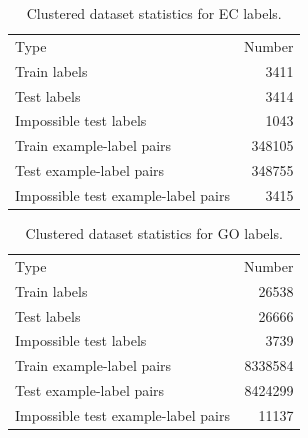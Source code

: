   \DIFaddend \begin{table}[htbp]
    \centering
    \begin{tabular}{|l|r|}
    \hline
                                    Type &  Number \\
    \Xhline{2pt}
                            Train labels &    3411 \\
    \hline
                             Test labels &    3414 \\
    \hline
                  Impossible test labels &    1043 \\
    \hline
               Train example-label pairs &  348105 \\
    \hline
                Test example-label pairs &  348755 \\
    \hline
     Impossible test example-label pairs &    3415 \\
    \hline
    \end{tabular}
    \caption{Clustered dataset statistics for EC labels.}
    \end{table}
  \begin{table}[htbp]
  \centering
  \begin{tabular}{|l|r|}
  \hline
                                  Type &   Number \\
  \Xhline{2pt}
                          Train labels &    26538 \\
  \hline
                           Test labels &    26666 \\
  \hline
                Impossible test labels &     3739 \\
  \hline
             Train example-label pairs &  8338584 \\
  \hline
              Test example-label pairs &  8424299 \\
  \hline
   Impossible test example-label pairs &    11137 \\
  \hline
  \end{tabular}
  \caption{Clustered dataset statistics for GO labels.}
  \end{table}
\DIFdelbegin %
\subsection{}
\addtocounter{subsection}{-1}%
\DIFdelend 



